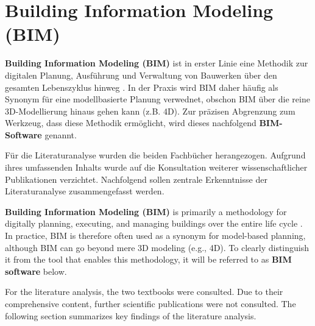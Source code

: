 \section{Building Information Modeling (BIM)}
\begin{German} 
    \textbf{Building Information Modeling (BIM)} ist in erster Linie eine Methodik zur digitalen Planung, Ausführung und Verwaltung von Bauwerken über den gesamten Lebenszyklus hinweg \cite{astourLehrbuchGrundlagenBIMArbeitsmethode2022}. In der Praxis wird BIM daher häufig als Synonym für eine modellbasierte Planung verwednet, obschon BIM über die reine 3D-Modellierung hinaus gehen kann (z.B. 4D). Zur präzisen Abgrenzung zum Werkzeug, dass diese Methodik ermöglicht, wird dieses nachfolgend \textbf{BIM-Software} genannt.

    Für die Literaturanalyse wurden die beiden Fachbücher \cite{astourLehrbuchGrundlagenBIMArbeitsmethode2022,mayBIMImImmobilienbetrieb2022} herangezogen. Aufgrund ihres umfassenden Inhalts wurde auf die Konsultation weiterer wissenschaftlicher Publikationen verzichtet. Nachfolgend sollen zentrale Erkenntnisse der Literaturanalyse zusammengefasst werden.
\end{German}

\begin{English}
    \textbf{Building Information Modeling (BIM)} is primarily a methodology for digitally planning, executing, and managing buildings over the entire life cycle \cite{astourLehrbuchGrundlagenBIMArbeitsmethode2022}. In practice, BIM is therefore often used as a synonym for model-based planning, although BIM can go beyond mere 3D modeling (e.g., 4D). To clearly distinguish it from the tool that enables this methodology, it will be referred to as \textbf{BIM software} below.

    For the literature analysis, the two textbooks \cite{astourLehrbuchGrundlagenBIMArbeitsmethode2022,mayBIMImImmobilienbetrieb2022} were consulted. Due to their comprehensive content, further scientific publications were not consulted. The following section summarizes key findings of the literature analysis.
\end{English}

